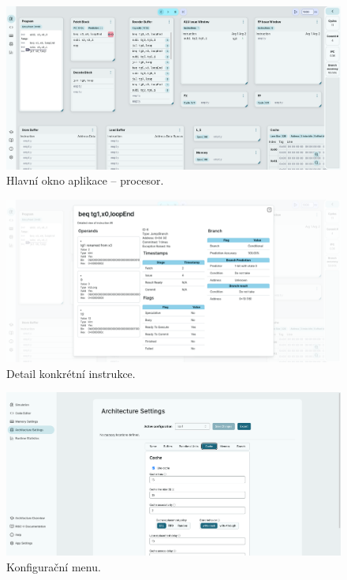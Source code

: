 \begin{figure}
    \includegraphics[width=\textwidth]{obrazky-figures/gallery/Selection_101.png}
    \caption{Hlavní okno aplikace -- procesor.}
    \label{gallery:main}
\end{figure}

\begin{figure}
    \includegraphics[width=\textwidth]{obrazky-figures/gallery/Selection_102.png}
    \caption{Detail konkrétní instrukce.}
    \label{gallery:instructionDetail}
\end{figure}

\begin{figure}
    \includegraphics[width=\textwidth]{obrazky-figures/gallery/Selection_103.png}
    \caption{Konfigurační menu.}
    \label{gallery:isaconfig}
\end{figure}

